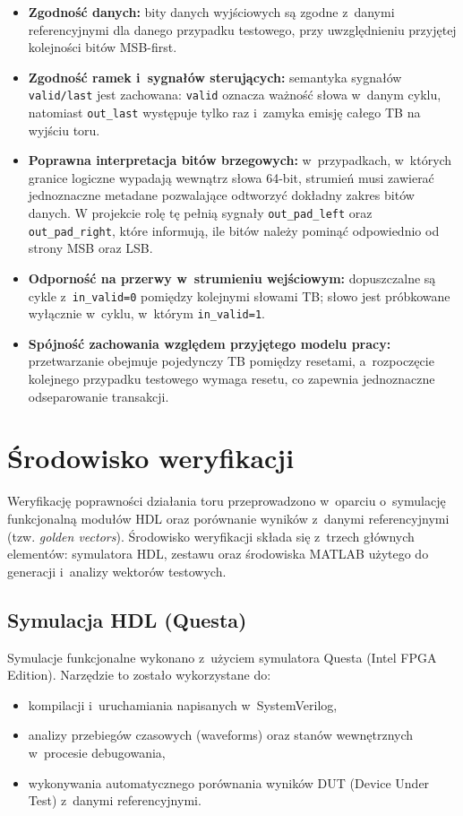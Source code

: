 \begin{itemize}
    \item \textbf{Zgodność danych:} bity danych wyjściowych są zgodne z~danymi referencyjnymi dla danego przypadku testowego,
    przy uwzględnieniu przyjętej kolejności bitów MSB-first.

    \item \textbf{Zgodność ramek i~sygnałów sterujących:} semantyka sygnałów \texttt{valid/last} jest zachowana:
    \texttt{valid} oznacza ważność słowa w~danym cyklu, natomiast \texttt{out\_last} występuje tylko raz i~zamyka
    emisję całego TB na wyjściu toru. 

    \item \textbf{Poprawna interpretacja bitów brzegowych:} w~przypadkach, w~których granice logiczne wypadają wewnątrz słowa 64-bit, strumień musi zawierać jednoznaczne metadane pozwalające
    odtworzyć dokładny zakres bitów danych. W projekcie rolę tę pełnią sygnały \texttt{out\_pad\_left} oraz
    \texttt{out\_pad\_right}, które informują, ile bitów należy pominąć odpowiednio od strony MSB oraz LSB. 

    \item \textbf{Odporność na przerwy w~strumieniu wejściowym:} dopuszczalne są cykle z~\texttt{in\_valid=0} pomiędzy kolejnymi
    słowami TB; słowo jest próbkowane wyłącznie w~cyklu, w~którym \texttt{in\_valid=1}. 

    \item \textbf{Spójność zachowania względem przyjętego modelu pracy:} przetwarzanie obejmuje pojedynczy TB pomiędzy resetami,
    a~rozpoczęcie kolejnego przypadku testowego wymaga resetu, co zapewnia jednoznaczne odseparowanie transakcji. 
\end{itemize}

\section{Środowisko weryfikacji}
\label{sec:walidacja_srodowisko}

Weryfikację poprawności działania toru przeprowadzono w~oparciu o~symulację funkcjonalną modułów HDL oraz porównanie wyników z~danymi referencyjnymi (tzw. \emph{golden vectors}). Środowisko weryfikacji składa się z~trzech głównych elementów: symulatora HDL, zestawu  oraz środowiska MATLAB użytego do generacji i~analizy wektorów testowych.

\subsection{Symulacja HDL (Questa)}
Symulacje funkcjonalne wykonano z~użyciem symulatora Questa (Intel FPGA Edition). Narzędzie to zostało wykorzystane do:
\begin{itemize}
    \item kompilacji i~uruchamiania  napisanych w~SystemVerilog,
    \item analizy przebiegów czasowych (waveforms) oraz stanów wewnętrznych w~procesie debugowania,
    \item wykonywania automatycznego porównania wyników DUT (Device Under Test) z~danymi referencyjnymi.
\end{itemize}

